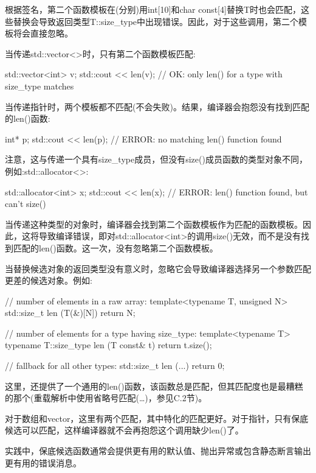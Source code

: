 根据签名，第二个函数模板在(分别)用int[10]和char const[4]替换T时也会匹配，这些替换会导致返回类型T::size\_type中出现错误。因此，对于这些调用，第二个模板将会直接忽略。

当传递std::vector<>时，只有第二个函数模板匹配:

\begin{cpp}
std::vector<int> v;
std::cout << len(v); // OK: only len() for a type with size_type matches
\end{cpp}

当传递指针时，两个模板都不匹配(不会失败)。结果，编译器会抱怨没有找到匹配的len()函数:

\begin{cpp}
int* p;
std::cout << len(p); // ERROR: no matching len() function found
\end{cpp}

注意，这与传递一个具有size\_type成员，但没有size()成员函数的类型对象不同，例如:std::allocator<>:

\begin{cpp}
std::allocator<int> x;
std::cout << len(x); // ERROR: len() function found, but can’t size()
\end{cpp}

当传递这种类型的对象时，编译器会找到第二个函数模板作为匹配的函数模板。因此，这将导致编译错误，即对std::allocator<int>的调用size()无效，而不是没有找到匹配的len()函数。这一次，没有忽略第二个函数模板。

当替换候选对象的返回类型没有意义时，忽略它会导致编译器选择另一个参数匹配更差的候选对象。例如:

\begin{cpp}
// number of elements in a raw array:
template<typename T, unsigned N>
std::size_t len (T(&)[N])
{
	return N;
}

// number of elements for a type having size_type:
template<typename T>
typename T::size_type len (T const& t)
{
	return t.size();
}

// fallback for all other types:
std::size_t len (...)
{
	return 0;
}
\end{cpp}

这里，还提供了一个通用的len()函数，该函数总是匹配，但其匹配度也是最糟糕的那个(重载解析中使用省略号匹配(…)，参见C.2节)。

对于数组和vector，这里有两个匹配，其中特化的匹配更好。对于指针，只有保底候选可以匹配，这样编译器就不会再抱怨这个调用缺少len()了。

\begin{notice}
实践中，保底候选函数通常会提供更有用的默认值、抛出异常或包含静态断言输出更有用的错误消息。
\end{notice}


